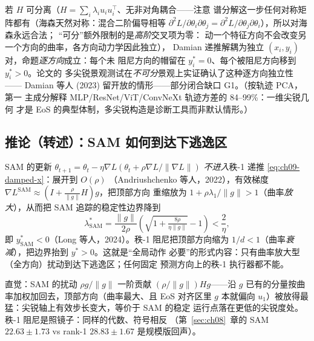 \begin{remark}
若 $H$ 可分离（$H=\sum_i\lambda_iu_iu_i^{\!\top}$、无非对角耦合——注意
谱分解这一步任何对称矩阵都有（海森天然对称：混合二阶偏导相等
$\partial^2L/\partial\theta_i\partial\theta_j=
\partial^2L/\partial\theta_j\partial\theta_i$），所以对海森永远合法；
``可分''额外限制的是\emph{高阶}交叉项为零：
动一个特征方向不会改变另一个方向的曲率，各方向动力学因此独立），
Damian 递推解耦为独立 $(x_i,y_i)$ 对，命题\emph{逐方向}成立：每个未
阻尼方向的帽留在 $y_i^{*}=0$、每个被阻尼方向移到 $y_i^{*}>0$。论文的
多尖锐景观测试在\emph{不可分}景观上实证确认了这种逐方向独立性——
Damian 等人 (2023) 留开放的情形——部分闭合缺口 G1。（按轨迹 PCA，第一
主成分解释 MLP/ResNet/ViT/ConvNeXt 轨迹方差的 84--99\%：一维尖锐几何
才是 EoS 的典型体制，多尖锐构造是诊断工具而非默认情形。）
\end{remark}

\subsection{推论（转述）：SAM 如何到达下逃逸区}\label{sec:ch09-sam}

\begin{corollary}
SAM 的更新
$\theta_{t+1}=\theta_t-\eta\nabla L(\theta_t+\rho\nabla L/\|\nabla L\|)$
\emph{不进入}秩-1 递推 \eqref{eq:ch09-damped-x}：展开到 $O(\rho)$
（Andriushchenko 等人，2022），有效梯度
$\nabla L^{\mathrm{SAM}}\approx(I+\tfrac{\rho}{\|g\|}H)g$，把顶部方向
重缩放为 $1+\rho\lambda_1/\|g\|>1$（曲率\emph{放大}），从而把 SAM
追踪的稳定性边界降到
\begin{equation}
  \lambda^{*}_{\mathrm{SAM}}
  =\frac{\|g\|}{2\rho}\!\left(\sqrt{1+\tfrac{8\rho}{\eta\|g\|}}-1\right)
  <\frac{2}{\eta},
  \label{eq:ch09-sam-boundary}
\end{equation}
即 $y^{*}_{\mathrm{SAM}}<0$（Long 等人，2024）。秩-1 阻尼把顶部方向缩为
$1/d<1$（曲率\emph{衰减}），把边界抬到 $y^{*}>0$。这就是“全局动作
必要”的形式内容：只有曲率放大型（全方向）扰动到达下逃逸区；任何固定
预测方向上的秩-1 执行器都不能。
\end{corollary}

直觉：SAM 的扰动 $\rho g/\|g\|$ 一阶贡献 $(\rho/\|g\|)Hg$——沿 $g$
已有的分量按曲率加权加回去，顶部方向（曲率最大、且 EoS 对齐区里 $g$
本就偏向 $u_1$）被放得最猛：尖锐轴上有效步长变大，等价于 SAM 的稳定
运行点落在更低的尖锐度处。秩-1 阻尼是照镜子：同样的代数、符号相反
（第~\ref{sec:ch08}~章的 SAM $22.63\pm1.73$ vs rank-1 $28.83\pm1.67$
是规模版回声）。

